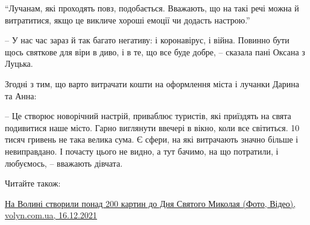 \begin{zznagolos}
\enquote{Лучанам, які проходять повз, подобається. Вважають, що на такі речі можна й
витратитися, якщо це викличе хороші емоції чи додасть настрою.}
\end{zznagolos}

– У нас час зараз й так багато негативу: і коронавірус, і війна. Повинно бути
щось святкове для віри в диво, і в те, що все буде добре, – сказала пані Оксана
з Луцька.

Згодні з тим, що варто витрачати кошти на оформлення міста і лучанки Дарина та
Анна:

– Це створює новорічний настрій, приваблює туристів, які приїздять на свята
подивитися наше місто. Гарно виглянути ввечері в вікно, коли все світиться. 10
тисяч гривень не така велика сума. Є сфери, на які витрачають значно більше і
невиправдано. І почасту цього не видно, а тут бачимо, на що потратили, і
любуємось, – вважають дівчата.


Читайте також:

\href{https://www.volyn.com.ua/news/201019-u-lutskii-khudozhnii-shkoli-vidkryly-vystavku-do-dnia-sviatoho-mykolaia-foto-video}{%
На Волині створили понад 200 картин до Дня Святого Миколая (Фото, Відео), volyn.com.ua, 16.12.2021%
}
